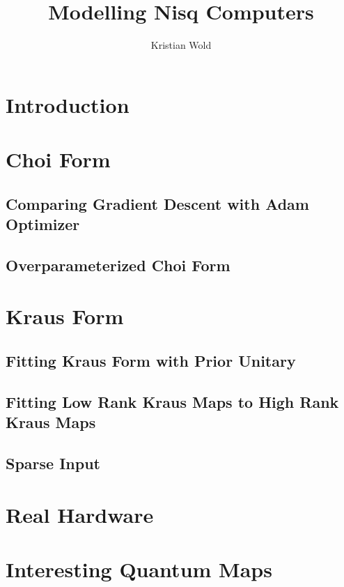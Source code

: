 \documentclass{article}
\title{Modelling Nisq Computers}
\author{Kristian Wold}
\begin{document}
\maketitle

\section{Introduction}

\section{Choi Form}

\subsection{Comparing Gradient Descent with Adam Optimizer}

\subsection{Overparameterized Choi Form}

\section{Kraus Form}

\subsection{Fitting Kraus Form with Prior Unitary}

\subsection{Fitting Low Rank Kraus Maps to High Rank Kraus Maps}

\subsection{Sparse Input}


\section{Real Hardware}

\section{Interesting Quantum Maps}
\end{document}
